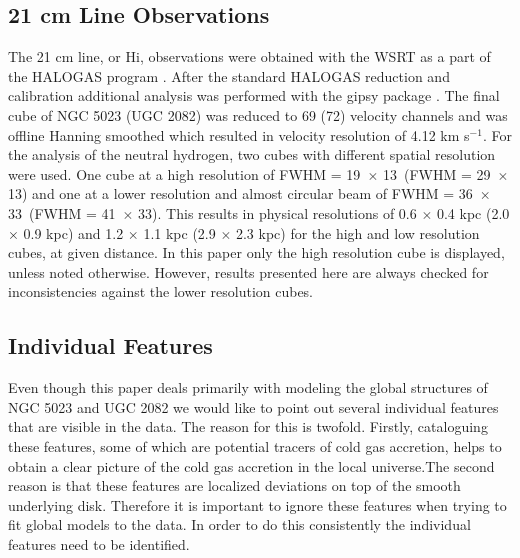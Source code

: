 \documentclass[useAMS,usenatbib]{mn2e}
\newcommand\HI{H{\sc i}}
\begin{document}
\subsection{21 cm Line Observations}
The 21 cm line, or \HI, observations were obtained with the WSRT as a part of the HALOGAS program \citep{2011A&A...526A.118H}.  After the standard HALOGAS reduction and calibration \citep{2011A&A...526A.118H} additional analysis was performed with the {\sc gipsy} package \citep{1992ASPC...25..131V}. The final cube of NGC 5023 (UGC 2082) was reduced to 69 (72) velocity channels and was offline Hanning smoothed which resulted in velocity resolution of 4.12 km s$^{-1} $. For the analysis of the neutral hydrogen, two cubes with different spatial resolution were used. One cube at a high resolution of  FWHM = 19\arcsec\ $\times$ 13\arcsec\ (FWHM = 29\arcsec\ $\times$ 13\arcsec) and one at a lower resolution and almost circular beam of  FWHM = 36\arcsec\ $\times$ 33\arcsec\ (FWHM = 41\arcsec\ $\times$ 33\arcsec). This results in physical resolutions of 0.6 $\times$ 0.4 kpc (2.0 $\times$ 0.9 kpc) and  1.2 $\times$ 1.1 kpc (2.9 $\times$ 2.3 kpc) for the high and low resolution cubes, at given distance. In this paper only the high resolution cube is displayed, unless noted otherwise. However, results presented here are always checked for inconsistencies against the lower resolution cubes.\\
\subsection{Individual Features}
Even though this paper deals primarily with modeling the global structures of NGC 5023 and UGC 2082 we would like to point out several individual  features that are visible in the data.  The reason for this is twofold. Firstly, cataloguing these features, some of which are potential tracers of cold gas accretion, helps to obtain a clear picture of the cold gas accretion in the local universe.The second reason is that these features are localized deviations on top of the smooth underlying disk. Therefore it is important to ignore these features when trying to fit global models to the data. In order to do this consistently the individual features need to be identified. 
\end{document}
